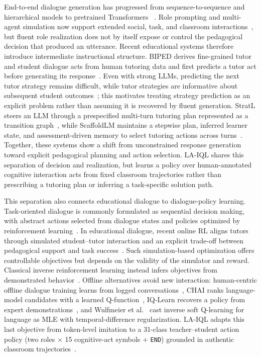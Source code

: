 \documentclass[manuscript,review,anonymous]{acmart}
\begin{document}
End-to-end dialogue generation has progressed from sequence-to-sequence and
hierarchical models to pretrained Transformers
~\citep{sutskever2014sequence,serban2017hierarchical,vinyals2015neural}.
Role prompting and multi-agent simulation now support extended social, task,
and classroom interactions~\citep{park2023generative,xi2025rise,zhang2024simulating},
but fluent role realization does not by itself expose or control the
pedagogical decision that produced an utterance. Recent educational systems
therefore introduce intermediate instructional structure. BIPED derives
fine-grained tutor and student dialogue acts from human tutoring data and first
predicts a tutor act before generating its response~\citep{kwon2024biped}.
Even with strong LLMs, predicting the next tutor strategy remains difficult,
while tutor strategies are informative about subsequent student
outcomes~\citep{ikram2025exploring}; this motivates treating strategy
prediction as an explicit problem rather than assuming it is recovered by
fluent generation.
StratL steers an LLM through a prespecified multi-turn tutoring plan represented
as a transition graph~\citep{puech2025steering}, while ScaffoldLM maintains a
stepwise plan, inferred learner state, and assessment-driven memory to select
tutoring actions across turns~\citep{li2026scaffoldlm}. Together, these systems
show a shift from unconstrained response generation toward explicit pedagogical
planning and action selection. LA-IQL shares this separation of decision and
realization, but learns a policy over human-annotated cognitive interaction acts
from fixed classroom trajectories rather than prescribing a tutoring plan or
inferring a task-specific solution path.

This separation also connects educational dialogue to dialogue-policy learning.
Task-oriented dialogue is commonly formulated as sequential decision making,
with abstract actions selected from dialogue states and policies optimized by
reinforcement learning~\citep{li2016deep,li2018dialogue}. In educational
dialogue, recent online RL aligns tutors through simulated student--tutor
interaction and an explicit trade-off between pedagogical support and task
success~\citep{dinucu2025teaching}. Such simulation-based optimization offers
controllable objectives but depends on the validity of the simulator and reward.
Classical inverse reinforcement learning instead infers objectives from
demonstrated behavior~\citep{ng2000algorithms,ziebart2008maximum,arora2021survey}.
Offline alternatives avoid new interaction: human-centric offline dialogue
training learns from logged conversations~\citep{jaques2020way}, CHAI ranks
language-model candidates with a learned Q-function~\citep{verma2022chai},
IQ-Learn recovers a policy from expert demonstrations~\citep{garg2021iqlearn}, and Wulfmeier et
al.~\citep{wulfmeier2024imitating} cast inverse soft Q-learning for language as
MLE with temporal-difference regularization. LA-IQL adapts this last objective
from token-level imitation to a 31-class teacher--student action policy (two
roles $\times$ 15 cognitive-act symbols $+$ \texttt{END}) grounded in authentic
classroom trajectories~\citep{songyu79,amatari2015}.
\end{document}
